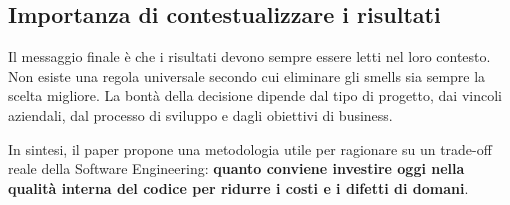 \subsection{Importanza di contestualizzare i risultati}

Il messaggio finale è che i risultati devono sempre essere letti nel loro contesto. Non esiste una regola universale secondo cui eliminare gli smells sia sempre la scelta migliore. La bontà della decisione dipende dal tipo di progetto, dai vincoli aziendali, dal processo di sviluppo e dagli obiettivi di business.

In sintesi, il paper propone una metodologia utile per ragionare su un trade-off reale della Software Engineering: \textbf{quanto conviene investire oggi nella qualità interna del codice per ridurre i costi e i difetti di domani}.